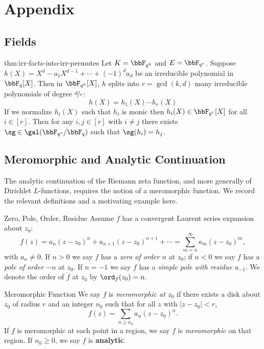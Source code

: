 \chapter{Appendix}
\section{Fields}
\begin{Theorem}{}{thm:irr-facts-into-irr-permutes}
  Let $K=\bbF_{q^k}$ and $E=\bbF_{q^r}$. Suppose $h(X)=X^d-a_1X^{d-1}+\cdots+(-1)^da_d$ be an irreducible polynomial in $\bbF_q[X]$. Then in $\bbF_{q^k}[X]$, $h$ splits into $r=\gcd(k,d)$ many irreducible polynomials of degree $\nicefrac{d}{r}$: $$h(X)=h_1(X)\cdots h_r(X)$$If we normalize $h_i(X)$ such that $h_i$ is monic then $h_i(X)\in\bbF_{q^r}[X]$ for all $i\in[r]$. Then for any $i,j\in[r]$ with $i\neq j$ there exists $\sg\in\gal(\bbF_{q^r}/\bbF_q)$ such that $\sg(h_i)=h_j$. 
\end{Theorem}
\section{Meromorphic and Analytic Continuation}\label{sec:meromorphic-analytic}

The analytic continuation of the Riemann zeta function, and more generally of Dirichlet $L$-functions, requires the notion of a meromorphic function. We record the relevant definitions and a motivating example here.

\begin{Definition}{Zero, Pole, Order, Residue}{}
  Assume $f$ has a convergent Laurent series expansion about $z_0$:
  $$f(z) = a_n(z-z_0)^n + a_{n+1}(z-z_0)^{n+1} + \cdots = \sum_{m=n}^{\infty} a_m(z-z_0)^m,$$
  with $a_n \neq 0$. If $n > 0$ we say $f$ has a \emph{zero of order $n$} at $z_0$; if $n < 0$ we say $f$ has a \emph{pole of order $-n$} at $z_0$. If $n = -1$ we say $f$ has a \emph{simple pole with residue $a_{-1}$}. We denote the order of $f$ at $z_0$ by $\ord_f(z_0) = n$.
\end{Definition}

\begin{Definition}{Meromorphic Function}{}
  We say $f$ is \emph{meromorphic at $z_0$} if there exists a disk about $z_0$ of radius $r$ and an integer $n_0$ such that for all $z$ with $|z - z_0| < r$,
  $$f(z) = \sum_{n \geq n_0} a_n(z-z_0)^n.$$
  If $f$ is meromorphic at each point in a region, we say $f$ is \emph{meromorphic} on that region. If $n_0 \geq 0$, we say $f$ is \textbf{analytic}.
\end{Definition}

